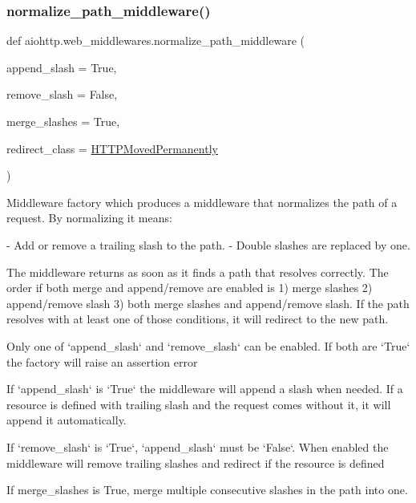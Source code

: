 \subsubsection{\texorpdfstring{normalize\+\_\+path\+\_\+middleware()}{normalize\_path\_middleware()}}
{\footnotesize\ttfamily def aiohttp.\+web\+\_\+middlewares.\+normalize\+\_\+path\+\_\+middleware (\begin{DoxyParamCaption}\item[{}]{append\+\_\+slash = {\ttfamily True},  }\item[{}]{remove\+\_\+slash = {\ttfamily False},  }\item[{}]{merge\+\_\+slashes = {\ttfamily True},  }\item[{}]{redirect\+\_\+class = {\ttfamily \hyperlink{classaiohttp_1_1web__exceptions_1_1_h_t_t_p_moved_permanently}{H\+T\+T\+P\+Moved\+Permanently}} }\end{DoxyParamCaption})}

\begin{DoxyVerb}Middleware factory which produces a middleware that normalizes
the path of a request. By normalizing it means:

    - Add or remove a trailing slash to the path.
    - Double slashes are replaced by one.

The middleware returns as soon as it finds a path that resolves
correctly. The order if both merge and append/remove are enabled is
    1) merge slashes
    2) append/remove slash
    3) both merge slashes and append/remove slash.
If the path resolves with at least one of those conditions, it will
redirect to the new path.

Only one of `append_slash` and `remove_slash` can be enabled. If both
are `True` the factory will raise an assertion error

If `append_slash` is `True` the middleware will append a slash when
needed. If a resource is defined with trailing slash and the request
comes without it, it will append it automatically.

If `remove_slash` is `True`, `append_slash` must be `False`. When enabled
the middleware will remove trailing slashes and redirect if the resource
is defined

If merge_slashes is True, merge multiple consecutive slashes in the
path into one.
\end{DoxyVerb}
 